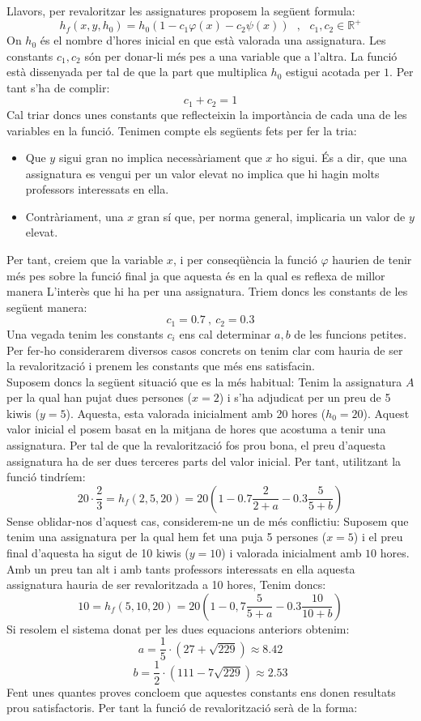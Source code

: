 \documentclass[10pt,twocolumn]{article}
\newcommand{\esp}{\text{ }}
\begin{document}
Llavors, per revaloritzar les assignatures proposem la següent formula:
$$h_f(x,y,h_0)=h_0(1-c_1\varphi(x)-c_2\psi (x))\esp ,\esp c_1,c_2\in\mathbb{R}^+$$
On $h_0$ és el nombre d'hores inicial en que està valorada una assignatura. Les constants $c_1,c_2$ són per donar-li més pes a una variable que a l'altra. La funció està dissenyada per tal de que la part que multiplica $h_0$ estigui acotada per $1$. Per tant s'ha de complir:
$$
c_1+c_2=1
$$
Cal triar doncs unes constants que reflecteixin la importància de cada una de les variables en la funció. Tenimen compte els següents fets per fer la tria:
\begin{itemize}
\item Que $y$ sigui gran no implica necessàriament que $x$ ho sigui. És a dir, que una assignatura es vengui per un valor elevat no implica que hi hagin molts professors interessats en ella. 
\item Contràriament, una $x$ gran sí que, per norma general, implicaria un valor de $y$ elevat.
\end{itemize}
Per tant, creiem que la variable $x$, i per conseqüència la funció $\varphi$ haurien de tenir més pes sobre la funció final ja que aquesta és en la qual es reflexa de millor manera L'interès que hi ha per una assignatura. Triem doncs les constants de les següent manera:
$$c_1=0.7\ ,\ c_2=0.3$$
Una vegada tenim les constants $c_i$ ens cal determinar $a,b$ de les funcions petites. Per fer-ho considerarem diversos casos concrets on tenim clar com hauria de ser la revalorització i prenem les constants que més ens satisfacin.
	\\
	Suposem doncs la següent situació que es la més habitual: Tenim la assignatura $A$ per la qual han pujat dues persones ($x=2$) i s'ha adjudicat per un preu de 5 kiwis ($y=5$). Aquesta, esta valorada inicialment amb 20 hores ($h_0=20$). Aquest valor inicial el posem basat en la mitjana de hores que acostuma a tenir una assignatura. Per tal de que la revalorització fos prou bona, el preu d'aquesta assignatura ha de ser dues terceres parts del valor inicial. Per tant, utilitzant la funció tindríem:
	$$20\cdot\frac{2}{3}=h_f(2,5,20)=20(1-0.7\frac{2}{2+a}-0.3\frac{5}{5+b})$$
	Sense oblidar-nos d'aquest cas, considerem-ne un de més conflictiu: Suposem que tenim una assignatura per la qual hem fet una puja 5 persones ($x=5$) i el preu final d'aquesta ha sigut de 10 kiwis ($y=10$) i valorada inicialment amb $10$ hores. Amb un preu tan alt i amb tants professors interessats en ella aquesta assignatura hauria de ser revaloritzada a 10 hores, Tenim doncs:
	$$10=h_f(5,10,20)=20(1-0,7\frac{5}{5+a}-0.3\frac{10}{10+b})$$
	Si resolem el sistema donat per les dues equacions anteriors obtenim:
	$$a=\frac{1}{5}\cdot (27+\sqrt{229})\approx 8.42$$
	$$b=\frac{1}{2}\cdot(111-7\sqrt{229})\approx 2.53$$
	Fent unes quantes proves concloem que aquestes constants ens donen resultats prou satisfactoris. Per tant la funció de revalorització serà de la forma:
	
\end{document}

